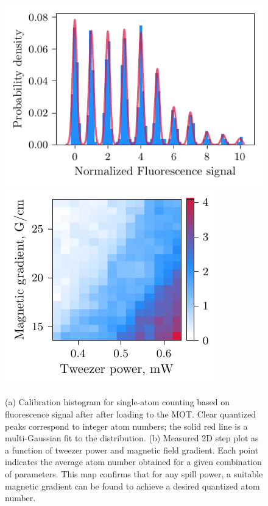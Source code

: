 \begin{figure}[h!]
    \centering
    \includegraphics{fig-py/atom-counting.pdf}
    \phantom{4242}
    \includegraphics{fig-py/step-plot-2d.pdf}
    \caption{
        (a) Calibration histogram for single-atom counting based on fluorescence signal after after loading to the MOT. Clear quantized peaks correspond to integer atom numbers; the solid red line is a multi-Gaussian fit to the distribution. 
        (b) Measured 2D step plot as a function of tweezer power and magnetic field gradient. Each point indicates the average atom number obtained for a given combination of parameters. This map confirms that for any spill power, a suitable magnetic gradient can be found to achieve a desired quantized atom number.
    }
    \label{fig:spillingadd}
\end{figure}







